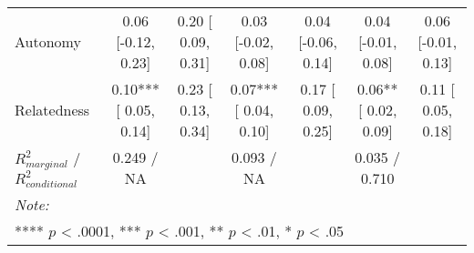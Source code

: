\begin{table}
\begin{minipage}[t][\textheight][t]{\textwidth}
{\begin{tabular}[t]{lcccccc}
\hspace{1em}Autonomy & 0.06 [-0.12,  0.23] & 0.20 [ 0.09, 0.31] & 0.03 [-0.02,  0.08] & 0.04 [-0.06, 0.14] & 0.04 [-0.01,  0.08] & 0.06 [-0.01, 0.13]\\
\hspace{1em}Relatedness & 0.10*** [ 0.05,  0.14] & 0.23 [ 0.13, 0.34] & 0.07*** [ 0.04,  0.10] & 0.17 [ 0.09, 0.25] & 0.06** [ 0.02,  0.09] & 0.11 [ 0.05, 0.18]\\
\hspace{1em}$R^2_{marginal}$ / $R^2_{conditional}$ & 0.249 / NA &  & 0.093 / NA &  & 0.035 / 0.710 & \\
\bottomrule
\multicolumn{7}{l}{\rule{0pt}{1em}\textit{Note: }}\\
\multicolumn{7}{l}{\rule{0pt}{1em}**** $p$ < .0001, *** $p$ < .001, ** $p$ < .01, * $p$ < .05}\\
\end{tabular}}
\end{minipage}
\end{table}
